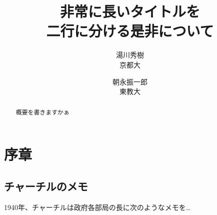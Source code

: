 \documentclass[titlepage]{jlreq}
\begin{document}
\title{非常に長いタイトルを \\ 二行に分ける是非について}
\author{湯川秀樹\\ 京都大 \and 朝永振一郎 \\ 東教大} 
\maketitle
\begin{abstract}
    概要を書きますかぁ
\end{abstract}

\section{序章}
\subsection{チャーチルのメモ}
 1940年、チャーチルは政府各部局の長に次のようなメモを…
\end{document}
